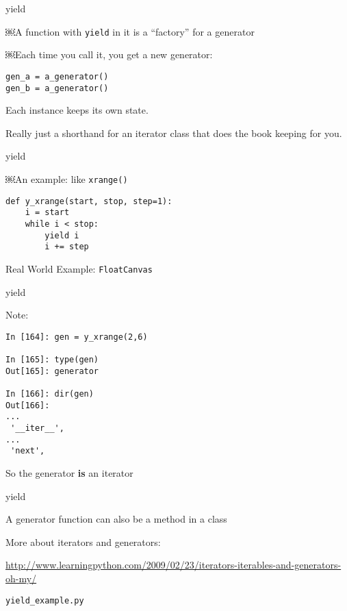 \documentclass{beamer}
\begin{document}
\begin{frame}[fragile]{yield}

\Large{￼A function with \verb|yield| in it is a ``factory'' for a generator}

\vfill
\Large{￼Each time you call it, you get a new generator:}
 
\vfill
\begin{verbatim}
gen_a = a_generator()
gen_b = a_generator()
\end{verbatim}

\vfill
\Large{ Each instance keeps its own state. }

\vfill
\Large{ Really just a shorthand for an iterator class that does the book keeping for you.}

\end{frame}

\begin{frame}[fragile]{yield}

\Large{￼An example: like \verb|xrange()|}

\begin{verbatim}
def y_xrange(start, stop, step=1):
    i = start
    while i < stop:
        yield i
        i += step
\end{verbatim}

\vfill
{\Large Real World Example: \verb|FloatCanvas|}
\end{frame}

\begin{frame}[fragile]{yield}

{\Large Note:}

\begin{verbatim}
In [164]: gen = y_xrange(2,6)

In [165]: type(gen)
Out[165]: generator

In [166]: dir(gen)
Out[166]: 
...
 '__iter__',
...
 'next',
\end{verbatim}
{\Large So the generator {\bf is} an iterator}
\end{frame}

\begin{frame}[fragile]{yield}

{\Large A generator function can also be a method in a class}

\vfill
{\Large More about iterators and generators:}

\vfill
\url{http://www.learningpython.com/2009/02/23/iterators-iterables-and-generators-oh-my/}

\vfill
\verb|yield_example.py|
\end{frame}
\end{document}
